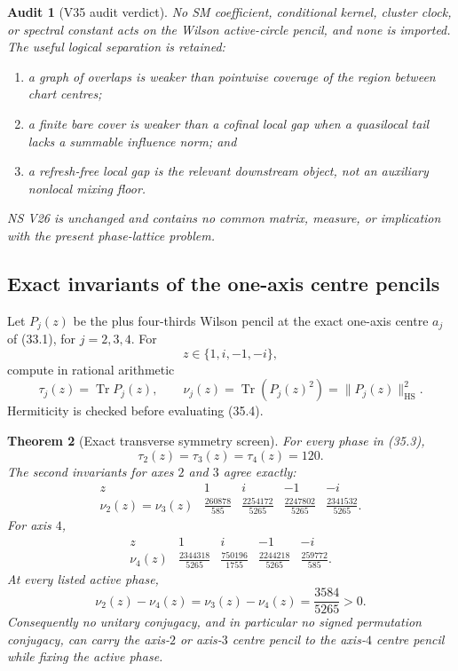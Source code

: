 \documentclass[11pt,oneside]{article}
\newtheorem{theorem}{Theorem}[section]
\newtheorem{audit}[theorem]{Audit}
\theoremstyle{definition}
\theoremstyle{remark}
\newcommand{\Tr}{\operatorname{Tr}}
\begin{document}
\begin{audit}[V35 audit verdict]
\label{aud:newv35-verdict}
No SM coefficient, conditional kernel, cluster clock, or spectral
constant acts on the Wilson active-circle pencil, and none is
imported.  The useful logical separation is retained:
\begin{enumerate}[label=\textup{(\roman*)}]
\item a graph of overlaps is weaker than pointwise coverage of the
      region between chart centres;
\item a finite bare cover is weaker than a cofinal local gap when
      a quasilocal tail lacks a summable influence norm; and
\item a refresh-free local gap is the relevant downstream object,
      not an auxiliary nonlocal mixing floor.
\end{enumerate}
NS V26 is unchanged and contains no common matrix, measure, or
implication with the present phase-lattice problem.
\end{audit}

\subsection{Exact invariants of the one-axis centre pencils}

Let \(P_j(z)\) be the plus four-thirds Wilson pencil at the exact
one-axis centre \(a_j\) of (33.1), for \(j=2,3,4\).  For
\[
 z\in\{1,i,-1,-i\},                                    \tag{35.3}
\]
compute in rational arithmetic
\[
 \tau_j(z)=\Tr P_j(z),\qquad
 \nu_j(z)=\Tr(P_j(z)^2)=\|P_j(z)\|_{\mathrm{HS}}^2.     \tag{35.4}
\]
Hermiticity is checked before evaluating (35.4).

\begin{theorem}[Exact transverse symmetry screen]
\label{thm:newv35-screen}
For every phase in (35.3),
\[
 \tau_2(z)=\tau_3(z)=\tau_4(z)=120.                     \tag{35.5}
\]
The second invariants for axes \(2\) and \(3\) agree exactly:
\[
\begin{array}{c|cccc}
z&1&i&-1&-i\\ \hline
\nu_2(z)=\nu_3(z)&
\frac{260878}{585}&
\frac{2254172}{5265}&
\frac{2247802}{5265}&
\frac{2341532}{5265}.
\end{array}                                             \tag{35.6}
\]
For axis \(4\),
\[
\begin{array}{c|cccc}
z&1&i&-1&-i\\ \hline
\nu_4(z)&
\frac{2344318}{5265}&
\frac{750196}{1755}&
\frac{2244218}{5265}&
\frac{259772}{585}.
\end{array}                                             \tag{35.7}
\]
At every listed active phase,
\[
 \nu_2(z)-\nu_4(z)=\nu_3(z)-\nu_4(z)
 =\frac{3584}{5265}>0.                                 \tag{35.8}
\]
Consequently no unitary conjugacy, and in particular no signed
permutation conjugacy, can carry the axis-\(2\) or axis-\(3\)
centre pencil to the axis-\(4\) centre pencil while fixing the
active phase.
\end{theorem}
\end{document}

